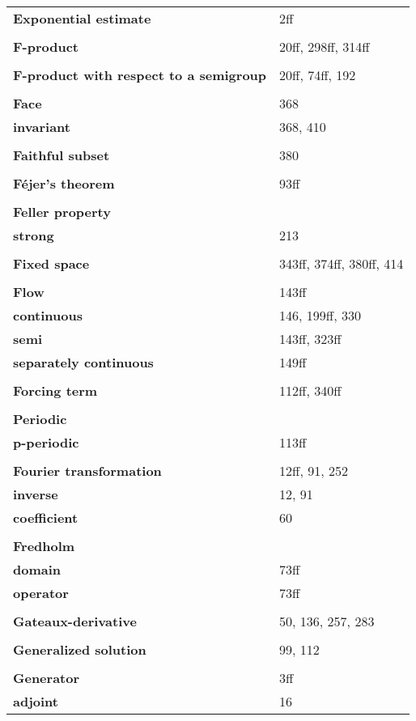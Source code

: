\documentclass[10pt]{scrartcl}
\begin{document}
\begin{longtable}{>{\bfseries}p{6cm}p{8cm}}
\textbf{Exponential estimate} & 2ff \\
\\
\textbf{F-product} & 20ff, 298ff, 314ff \\
\\
\textbf{F-product with respect to a semigroup} & 20ff, 74ff, 192 \\
\\
\textbf{Face} & 368 \\
\quad invariant & 368, 410 \\
\\
\textbf{Faithful subset} & 380 \\
\\
\textbf{Féjer's theorem} & 93ff \\
\\
\textbf{Feller property} & \\
\quad strong & 213 \\
\\
\textbf{Fixed space} & 343ff, 374ff, 380ff, 414 \\
\\
\textbf{Flow} & 143ff \\
\quad continuous & 146, 199ff, 330 \\
\quad semi & 143ff, 323ff \\
\quad separately continuous & 149ff \\
\\
\textbf{Forcing term} & 112ff, 340ff \\
\\
\textbf{Periodic} & \\
\quad p-periodic & 113ff \\
\\
\textbf{Fourier transformation} & 12ff, 91, 252 \\
\quad inverse & 12, 91 \\
\quad coefficient & 60 \\
\\
\textbf{Fredholm} & \\
\quad domain & 73ff \\
\quad operator & 73ff \\
\\
\textbf{Gateaux-derivative} & 50, 136, 257, 283 \\
\\
\textbf{Generalized solution} & 99, 112 \\
\\
\textbf{Generator} & 3ff \\
\quad adjoint & 16 \\

\end{longtable}
\end{document}
